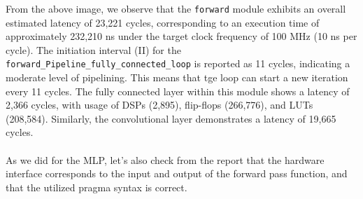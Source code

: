 \documentclass{article}
\begin{document}
From the above image, we observe that the \texttt{forward} module exhibits an overall estimated latency of 23,221 cycles, corresponding to an execution time of approximately 232,210 ns under the target clock frequency of 100 MHz (10 ns per cycle). The initiation interval (II) for the \texttt{forward\_Pipeline\_fully\_connected\_loop} is reported as 11 cycles, indicating a moderate level of pipelining. This means that tge loop can start a new iteration every 11 cycles. The fully connected layer within this module shows a latency of 2,366 cycles, with usage of DSPs (2,895), flip-flops (266,776), and LUTs (208,584). Similarly, the convolutional layer demonstrates a latency of 19,665 cycles.
\\\\As we did for the MLP, let's also check from the report that the hardware interface corresponds to the input and output of the forward pass function, and that the utilized pragma syntax is correct.
\end{document}
